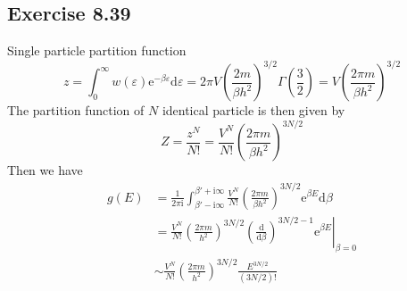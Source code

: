 \documentclass[]{ctexart}
\begin{document}
		\subsection{Exercise 8.39}
		Single particle partition function 
		\begin{equation}
		z=\int_0^\infty w(\varepsilon)\mathrm{e}^{-\beta\varepsilon}\mathrm{d}\varepsilon=2\pi V\left(\frac{2m}{\beta h^2}\right)^{3/2}\Gamma\left(\frac 32\right)=V\left(\frac{2\pi m}{\beta h^2}\right)^{3/2}
		\end{equation}
		The partition function of $N$ identical particle is then given by 
		\begin{equation*}
		Z=\frac{z^N}{N!}=\frac{V^N}{N!}\left(\frac{2\pi m}{\beta h^2}\right)^{3N/2}
		\end{equation*}
		Then we have
		\begin{align*}
		g(E)&=\frac{1}{2\pi\mathrm{i}}\int_{\beta'-\mathrm{i}\infty}^{\beta'+\mathrm{i}\infty}\frac{V^N}{N!}\left(\frac{2\pi m}{\beta h^2}\right)^{3N/2}\mathrm{e}^{\beta E}\mathrm{d}\beta \\
		&=\frac{V^N}{N!}\left(\frac{2\pi m}{h^2}\right)^{3N/2}\left.\left(\frac{\mathrm{d}}{\mathrm{d}\beta}\right)^{3N/2-1}\mathrm{e}^{\beta E}\right|_{\beta=0}\\
		&\sim \frac{V^N}{N!}\left(\frac{2\pi m}{h^2}\right)^{3N/2}\frac{E^{3N/2}}{(3N/2)!}
		\end{align*}
		
\end{document}
